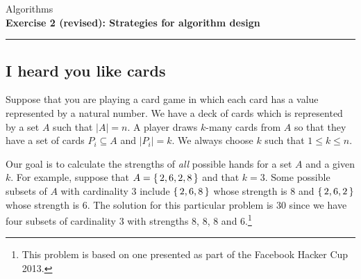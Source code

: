 \documentclass[10pt,a4paper,fleqn]{exam}
\begin{document}
\begin{center}
\Large Algorithms \\
\LARGE \textbf{Exercise 2 (revised): Strategies for algorithm design} \\
\end{center}

\hrule

\vspace{0.5cm}


\begin{questions}

\section{I heard you like cards}

\question Suppose that you are playing a card game in which each card has a value represented by a natural number. We have a deck of cards which is represented by a set $A$ such that $\left|A\right|=n$. A player draws $k$-many cards from $A$ so that they have a set of cards $P_i \subseteq A$ and $\left|P_i\right| = k$. We always choose $k$ such that $1 \leq k \leq n$.

Our goal is to calculate the strengths of \emph{all} possible hands for a set $A$ and a given $k$. For example, suppose that $A = \{\,2,6,2,8\,\}$ and that $k = 3$. Some possible subsets of $A$ with cardinality $3$ include $\{\,2,6,8\,\}$ whose strength is $8$ and $\{\,2,6,2\,\}$ whose strength is $6$. The solution for this particular problem is $30$ since we have four subsets of cardinality $3$ with strengths 8, 8, 8 and 6.\footnote{This problem is based on one presented as part of the Facebook Hacker Cup 2013.}
\end{questions}
\end{document}
